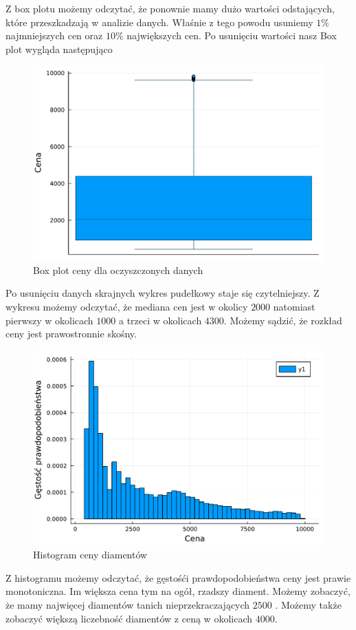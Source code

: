 \documentclass[12pt,leqno]{article}
\theoremstyle{exer}
\begin{document}
	Z box plotu możemy odczytać, że ponownie mamy dużo wartości odstających, które przeszkadzają w analizie danych. Właśnie z tego powodu usuniemy $ 1 \% $ najmniejszych cen oraz  $ 10\%$ największych cen.
	Po usunięciu wartości nasz Box plot wygląda następująco
	\begin{figure}[H]
		\centering
		\includegraphics[width=4\columnwidth/5]{images/boxplot_price_danych_oczyszczonych.pdf}
		\caption{Box plot ceny dla oczyszczonych danych}
		\label{fig:box_price}
	\end{figure}
	Po usunięciu danych skrajnych wykres pudełkowy staje się czytelniejszy. Z wykresu możemy odczytać, że mediana cen jest w okolicy $2000$ natomiast pierwszy w okolicach $1000$ a trzeci w okolicach $4300$. Możemy sądzić, że rozkład ceny jest prawostronnie skośny.
	
	\begin{figure}[H]
		\centering
		\includegraphics[width=4\columnwidth/5]{images/histogram_price.pdf}
		\caption{Histogram ceny diamentów}
		\label{fig:hist_price}
	\end{figure}
 Z histogramu możemy odczytać, że gęstośći prawdopodobieństwa ceny jest prawie monotoniczna. Im większa cena tym na ogół, rzadszy diament. Możemy zobaczyć, że mamy najwięcej diamentów tanich nieprzekraczających $2500$ . Możemy także zobaczyć większą liczebność diamentów z ceną w okolicach $4000$. 
 
\end{document}
